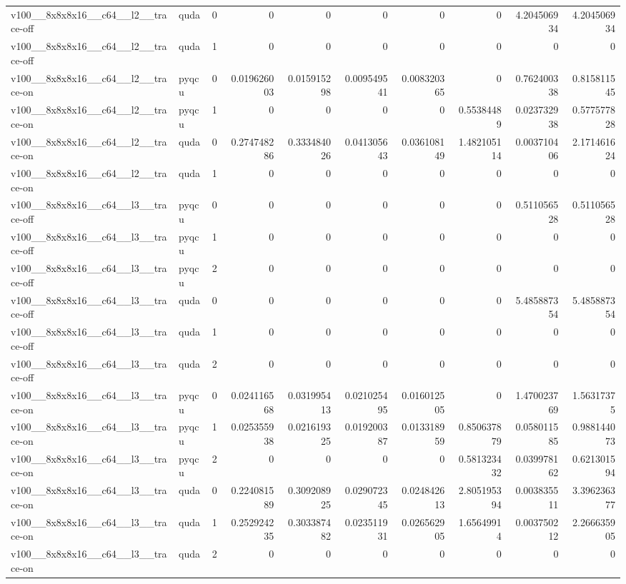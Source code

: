 \begin{table}[htbp]
\begin{tabular}{@{}llrrrrrrrr@{}}
v100\_\_8x8x8x16\_\_c64\_\_l2\_\_trace-off & quda & 0 & 0 & 0 & 0 & 0 & 0 & 4.204506934 & 4.204506934 \\
v100\_\_8x8x8x16\_\_c64\_\_l2\_\_trace-off & quda & 1 & 0 & 0 & 0 & 0 & 0 & 0 & 0 \\
v100\_\_8x8x8x16\_\_c64\_\_l2\_\_trace-on & pyqcu & 0 & 0.019626003 & 0.015915298 & 0.009549541 & 0.008320365 & 0 & 0.762400338 & 0.815811545 \\
v100\_\_8x8x8x16\_\_c64\_\_l2\_\_trace-on & pyqcu & 1 & 0 & 0 & 0 & 0 & 0.55384489 & 0.023732938 & 0.577577828 \\
v100\_\_8x8x8x16\_\_c64\_\_l2\_\_trace-on & quda & 0 & 0.274748286 & 0.333484026 & 0.041305643 & 0.036108149 & 1.482105114 & 0.003710406 & 2.171461624 \\
v100\_\_8x8x8x16\_\_c64\_\_l2\_\_trace-on & quda & 1 & 0 & 0 & 0 & 0 & 0 & 0 & 0 \\
v100\_\_8x8x8x16\_\_c64\_\_l3\_\_trace-off & pyqcu & 0 & 0 & 0 & 0 & 0 & 0 & 0.511056528 & 0.511056528 \\
v100\_\_8x8x8x16\_\_c64\_\_l3\_\_trace-off & pyqcu & 1 & 0 & 0 & 0 & 0 & 0 & 0 & 0 \\
v100\_\_8x8x8x16\_\_c64\_\_l3\_\_trace-off & pyqcu & 2 & 0 & 0 & 0 & 0 & 0 & 0 & 0 \\
v100\_\_8x8x8x16\_\_c64\_\_l3\_\_trace-off & quda & 0 & 0 & 0 & 0 & 0 & 0 & 5.485887354 & 5.485887354 \\
v100\_\_8x8x8x16\_\_c64\_\_l3\_\_trace-off & quda & 1 & 0 & 0 & 0 & 0 & 0 & 0 & 0 \\
v100\_\_8x8x8x16\_\_c64\_\_l3\_\_trace-off & quda & 2 & 0 & 0 & 0 & 0 & 0 & 0 & 0 \\
v100\_\_8x8x8x16\_\_c64\_\_l3\_\_trace-on & pyqcu & 0 & 0.024116568 & 0.031995413 & 0.021025495 & 0.016012505 & 0 & 1.470023769 & 1.56317375 \\
v100\_\_8x8x8x16\_\_c64\_\_l3\_\_trace-on & pyqcu & 1 & 0.025355938 & 0.021619325 & 0.019200387 & 0.013318959 & 0.850637879 & 0.058011585 & 0.988144073 \\
v100\_\_8x8x8x16\_\_c64\_\_l3\_\_trace-on & pyqcu & 2 & 0 & 0 & 0 & 0 & 0.581323432 & 0.039978162 & 0.621301594 \\
v100\_\_8x8x8x16\_\_c64\_\_l3\_\_trace-on & quda & 0 & 0.224081589 & 0.309208925 & 0.029072345 & 0.024842613 & 2.805195394 & 0.003835511 & 3.396236377 \\
v100\_\_8x8x8x16\_\_c64\_\_l3\_\_trace-on & quda & 1 & 0.252924235 & 0.303387482 & 0.023511931 & 0.026562905 & 1.65649914 & 0.003750212 & 2.266635905 \\
v100\_\_8x8x8x16\_\_c64\_\_l3\_\_trace-on & quda & 2 & 0 & 0 & 0 & 0 & 0 & 0 & 0 \\
\bottomrule
\end{tabular}
\end{table}

